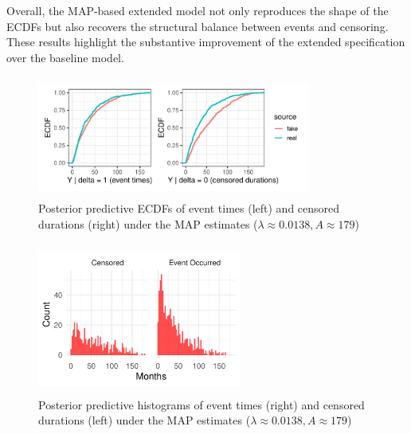 Overall, the MAP-based extended model not only reproduces the shape of the ECDFs but also recovers the structural balance between events and censoring. These results highlight the substantive improvement of the extended specification over the baseline model.
\begin{figure}[H]
    \centering
    \includegraphics[height=4cm, width=0.8\textwidth]{images/ppc_two_map.pdf}
    \caption{{\small Posterior predictive ECDFs of event times (left) and censored durations (right) under the MAP estimates ($\lambda \approx 0.0138, A \approx 179$)}}
    \label{fig:ppc_map}
\end{figure}

\begin{figure}[H]
    \centering
    \includegraphics[height=5cm, width=0.6\textwidth]{images/fake_duration_hist_Apost.pdf}
    \caption{{\small Posterior predictive histograms of event times (right) and censored durations (left) under the MAP estimates ($\lambda \approx 0.0138, A \approx 179$)}}
    \label{fig:fake_map}
\end{figure}